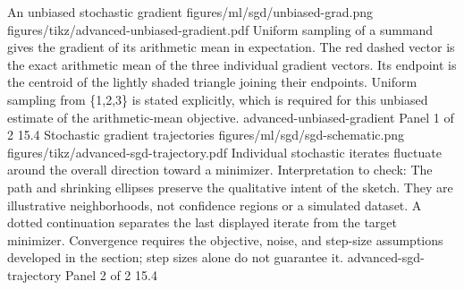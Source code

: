 {An unbiased stochastic gradient}
{figures/ml/sgd/unbiased-grad.png}
{figures/tikz/advanced-unbiased-gradient.pdf}
{Uniform sampling of a summand gives the gradient of its arithmetic mean in expectation.}
{The red dashed vector is the exact arithmetic mean of the three individual gradient vectors. Its endpoint is the centroid of the lightly shaded triangle joining their endpoints. Uniform sampling from \{1,2,3\} is stated explicitly, which is required for this unbiased estimate of the arithmetic-mean objective.}
{advanced-unbiased-gradient}
{Panel 1 of 2}
{15.4}
{Stochastic gradient trajectories}
{figures/ml/sgd/sgd-schematic.png}
{figures/tikz/advanced-sgd-trajectory.pdf}
{Individual stochastic iterates fluctuate around the overall direction toward a minimizer.}
{Interpretation to check: The path and shrinking ellipses preserve the qualitative intent of the sketch. They are illustrative neighborhoods, not confidence regions or a simulated dataset. A dotted continuation separates the last displayed iterate from the target minimizer. Convergence requires the objective, noise, and step-size assumptions developed in the section; step sizes alone do not guarantee it.}
{advanced-sgd-trajectory}
{Panel 2 of 2}
{15.4}
